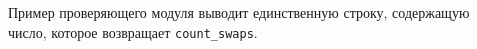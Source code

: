 Пример проверяющего модуля выводит единственную строку, содержащую число,
которое возвращает \texttt{count\_swaps}.